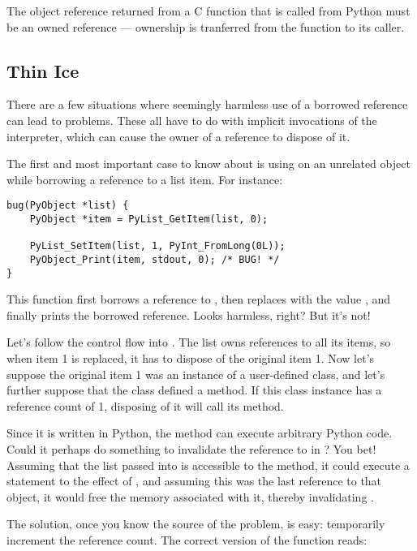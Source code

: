 The object reference returned from a C function that is called from
Python must be an owned reference --- ownership is tranferred from the
function to its caller.


\subsection{Thin Ice
            \label{thinIce}}

There are a few situations where seemingly harmless use of a borrowed
reference can lead to problems.  These all have to do with implicit
invocations of the interpreter, which can cause the owner of a
reference to dispose of it.

The first and most important case to know about is using
 on an unrelated object while borrowing a
reference to a list item.  For instance:

\begin{verbatim}
bug(PyObject *list) {
    PyObject *item = PyList_GetItem(list, 0);

    PyList_SetItem(list, 1, PyInt_FromLong(0L));
    PyObject_Print(item, stdout, 0); /* BUG! */
}
\end{verbatim}

This function first borrows a reference to , then
replaces  with the value , and finally prints
the borrowed reference.  Looks harmless, right?  But it's not!

Let's follow the control flow into .  The list
owns references to all its items, so when item 1 is replaced, it has
to dispose of the original item 1.  Now let's suppose the original
item 1 was an instance of a user-defined class, and let's further
suppose that the class defined a  method.  If this
class instance has a reference count of 1, disposing of it will call
its  method.

Since it is written in Python, the  method can execute
arbitrary Python code.  Could it perhaps do something to invalidate
the reference to  in ?  You bet!  Assuming
that the list passed into  is accessible to the
 method, it could execute a statement to the effect of
, and assuming this was the last reference to that
object, it would free the memory associated with it, thereby
invalidating .

The solution, once you know the source of the problem, is easy:
temporarily increment the reference count.  The correct version of the
function reads:


